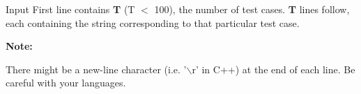 Input  
First line contains   \textbf{    T   }   (T $<$ 100), the number of test cases.   \textbf{    T   }   lines follow, each containing the string corresponding to that particular test case.  

\textbf{    Note:   }

   There might be a new-line character (i.e. '$\backslash$r' in C++) at the end of each line. Be careful with your languages.
